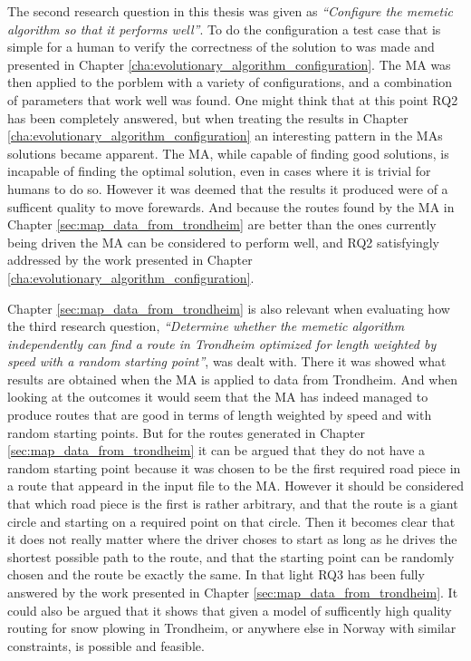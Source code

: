 The second research question in this thesis was given as \emph{\enquote{Configure the memetic algorithm so that it performs well}}. To do the configuration a test case that is simple for a human to verify the correctness of the solution to was made and presented in Chapter \ref{cha:evolutionary_algorithm_configuration}. The MA was then applied to the porblem with a variety of configurations, and a combination of parameters that work well was found. One might think that at this point RQ2 has been completely answered, but when treating the results in Chapter \ref{cha:evolutionary_algorithm_configuration} an interesting pattern in the MAs solutions became apparent. The MA, while capable of finding good solutions, is incapable of finding the optimal solution, even in cases where it is trivial for humans to do so. However it was deemed that the results it produced were of a sufficent quality to move forewards. And because the routes found by the MA in Chapter \ref{sec:map_data_from_trondheim} are better than the ones currently being driven the MA can be considered to perform well, and RQ2 satisfyingly addressed by the work presented in Chapter \ref{cha:evolutionary_algorithm_configuration}.

Chapter \ref{sec:map_data_from_trondheim} is also relevant when evaluating how the third research question, \emph{\enquote{Determine whether the memetic algorithm independently can find a route in Trondheim optimized for length weighted by speed with a random starting point}}, was dealt with. There it was showed what results are obtained when the MA is applied to data from Trondheim. And when looking at the outcomes it would seem that the MA has indeed managed to produce routes that are good in terms of length weighted by speed and with random starting points. But for the routes generated in Chapter \ref{sec:map_data_from_trondheim} it can be argued that they do not have a random starting point because it was chosen to be the first required road piece in a route that appeard in the input file to the MA. However it should be considered that which road piece is the first is rather arbitrary, and that the route is a giant circle and starting on a required point on that circle. Then it becomes clear that it does not really matter where the driver choses to start as long as he drives the shortest possible path to the route, and that the starting point can be randomly chosen and the route be exactly the same. In that light RQ3 has been fully answered by the work presented in Chapter \ref{sec:map_data_from_trondheim}. It could also be argued that it shows that given a model of sufficently high quality routing for snow plowing in Trondheim, or anywhere else in Norway with similar constraints, is possible and feasible.

